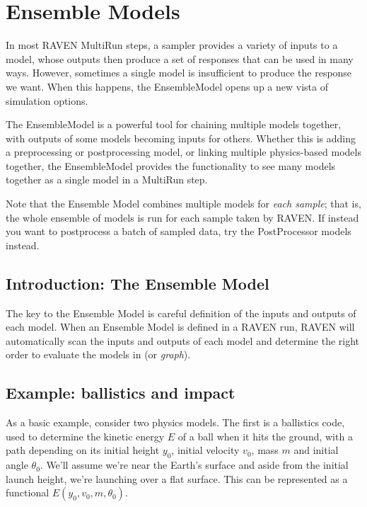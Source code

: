 \section{Ensemble Models}
\label{sec:ensembleModel}


In most RAVEN MultiRun steps, a sampler provides a variety of inputs to a model, whose outputs then produce a
set of responses that can be used in many ways.  However, sometimes a single model is insufficient to produce
the response we want.  When this happens, the EnsembleModel opens up a new vista of simulation options.

The EnsembleModel is a powerful tool for chaining multiple models together, with outputs of some models
becoming inputs for others.  Whether this is adding a preprocessing or postprocessing model, or linking
multiple physics-based models together, the EnsembleModel provides the functionality to see many models
together as a single model in a MultiRun step.

Note that the Ensemble Model combines multiple models for \emph{each sample}; that is, the whole ensemble of
models is run for each sample taken by RAVEN.  If instead you want to postprocess a batch of sampled data, try
the PostProcessor models instead.

\subsection{Introduction: The Ensemble Model}
The key to the Ensemble Model is careful definition of the inputs and outputs of each model.  When an
Ensemble Model is defined in a RAVEN run, RAVEN will automatically scan the inputs and outputs of each model
and determine the right order to evaluate the models in (or \emph{graph}).

\subsection{Example: ballistics and impact}
As a basic example, consider two physics models.  The first is a ballistics code, used to determine the
kinetic energy $E$ of a ball when it hits the ground, with a path depending on its initial height $y_0$, initial velocity
$v_0$, mass $m$ and initial angle $\theta_0$.  We'll assume we're near the Earth's surface and aside from the initial
launch height, we're launching over a flat surface.  This can be represented as a functional $E(y_0,v_0,m,\theta_0)$.

